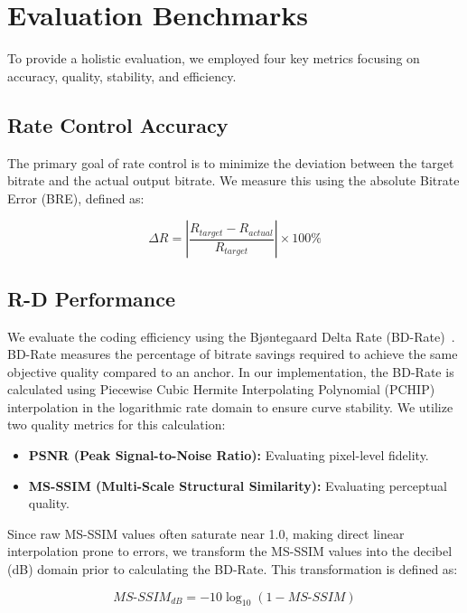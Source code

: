\section{Evaluation Benchmarks}

To provide a holistic evaluation, we employed four key metrics focusing on accuracy, quality, stability, and efficiency.

\subsection{Rate Control Accuracy}
The primary goal of rate control is to minimize the deviation between the target bitrate and the actual output bitrate. We measure this using the absolute Bitrate Error (BRE), defined as:

\begin{equation}
    \Delta R = \left| \frac{R_{target} - R_{actual}}{R_{target}} \right| \times 100\%
\end{equation}

\subsection{R-D Performance}
We evaluate the coding efficiency using the Bjøntegaard Delta Rate (BD-Rate)~\cite{06}. BD-Rate measures the percentage of bitrate savings required to achieve the same objective quality compared to an anchor. In our implementation, the BD-Rate is calculated using Piecewise Cubic Hermite Interpolating Polynomial (PCHIP) interpolation in the logarithmic rate domain to ensure curve stability. We utilize two quality metrics for this calculation:

\begin{itemize}
    \item \textbf{PSNR (Peak Signal-to-Noise Ratio):} Evaluating pixel-level fidelity.
    \item \textbf{MS-SSIM (Multi-Scale Structural Similarity):} Evaluating perceptual quality.
\end{itemize}

Since raw MS-SSIM values often saturate near 1.0, making direct linear interpolation prone to errors, we transform the MS-SSIM values into the decibel (dB) domain prior to calculating the BD-Rate. This transformation is defined as:

\begin{equation}
    MS\text{-}SSIM_{dB} = -10 \log_{10}(1 - MS\text{-}SSIM)
\end{equation}


